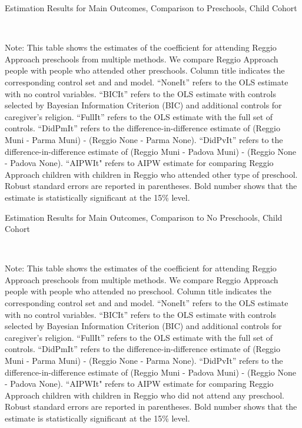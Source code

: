 \begin{landscape}

\begin{table}[H] \caption{Estimation Results for Main Outcomes, Comparison to Preschools, Child Cohort} \label{ols-M-child-reg-pres}
\scalebox{0.9}{}
\vspace{1ex} \\
\footnotesize\raggedright{Note: This table shows the estimates of the coefficient for attending Reggio Approach preschools from multiple methods. We compare Reggio Approach people with people who attended other preschools. Column title indicates the corresponding control set and and model. ``NoneIt'' refers to the OLS estimate with no control variables. ``BICIt'' refers to the OLS estimate with controls selected by Bayesian Information Criterion (BIC) and additional controls for caregiver's religion. ``FullIt'' refers to the OLS estimate with the full set of controls. ``DidPmIt'' refers to the difference-in-difference estimate of (Reggio Muni - Parma Muni) - (Reggio None - Parma None). ``DidPvIt'' refers to the difference-in-difference estimate of (Reggio Muni - Padova Muni) - (Reggio None - Padova None). ``AIPWIt" refers to AIPW estimate for comparing Reggio Approach children with children in Reggio who attended other type of preschool. Robust standard errors are reported in parentheses. Bold number shows that the estimate is statistically significant at the 15\% level.}

\end{table}


\begin{table}[H] \caption{Estimation Results for Main Outcomes, Comparison to No Preschools, Child Cohort} \label{ols-M-child-reg-nopres}
\scalebox{0.9}{}
\vspace{1ex} \\
\footnotesize\raggedright{Note: This table shows the estimates of the coefficient for attending Reggio Approach preschools from multiple methods. We compare Reggio Approach people with people who attended no preschool. Column title indicates the corresponding control set and and model. ``NoneIt'' refers to the OLS estimate with no control variables. ``BICIt'' refers to the OLS estimate with controls selected by Bayesian Information Criterion (BIC) and additional controls for caregiver's religion. ``FullIt'' refers to the OLS estimate with the full set of controls. ``DidPmIt'' refers to the difference-in-difference estimate of (Reggio Muni - Parma Muni) - (Reggio None - Parma None). ``DidPvIt'' refers to the difference-in-difference estimate of (Reggio Muni - Padova Muni) - (Reggio None - Padova None). ``AIPWIt" refers to AIPW estimate for comparing Reggio Approach children with children in Reggio who did not attend any preschool. Robust standard errors are reported in parentheses. Bold number shows that the estimate is statistically significant at the 15\% level.}


\end{table}
\end{landscape}
